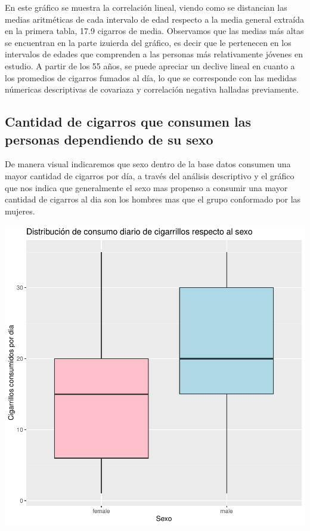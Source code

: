 \documentclass[
  stu,
  longtable,
  nolmodern,
  notxfonts,
  notimes,
  colorlinks=true,linkcolor=blue,citecolor=blue,urlcolor=blue]{apa7}
\begin{document}
En este gráfico se muestra la correlación lineal, viendo como se
distancian las medias aritméticas de cada intervalo de edad respecto a
la media general extraída en la primera tabla, 17.9 cigarros de media.
Observamos que las medias más altas se encuentran en la parte izuierda
del gráfico, es decir que le pertenecen en los intervalos de edades que
comprenden a las personas más relativamente jóvenes en estudio. A partir
de los 55 años, se puede apreciar un declive lineal en cuanto a los
promedios de cigarros fumados al día, lo que se corresponde con las
medidas númericas descriptivas de covariaza y correlación negativa
halladas previamente.

\subsection{Cantidad de cigarros que consumen las personas dependiendo
de su
sexo}\label{cantidad-de-cigarros-que-consumen-las-personas-dependiendo-de-su-sexo}

De manera visual indicaremos que sexo dentro de la base datos consumen
una mayor cantidad de cigarros por día, a través del análisis
descriptivo y el gráfico que nos indica que generalmente el sexo mas
propenso a consumir una mayor cantidad de cigarros al dia son los
hombres mas que el grupo conformado por las mujeres.

\includegraphics{Plantilla_Apa_files/figure-pdf/unnamed-chunk-2-1.pdf}
\end{document}
